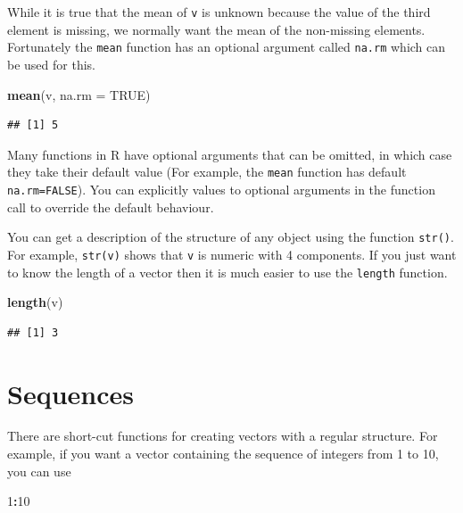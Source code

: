 \documentclass[
]{book}
\newenvironment{Shaded}{\begin{snugshade}}{\end{snugshade}}
\newcommand{\AttributeTok}[1]{\textcolor[rgb]{0.13,0.29,0.53}{#1}}
\newcommand{\ConstantTok}[1]{\textcolor[rgb]{0.56,0.35,0.01}{#1}}
\newcommand{\DecValTok}[1]{\textcolor[rgb]{0.00,0.00,0.81}{#1}}
\newcommand{\FunctionTok}[1]{\textcolor[rgb]{0.13,0.29,0.53}{\textbf{#1}}}
\newcommand{\NormalTok}[1]{#1}
\newcommand{\SpecialCharTok}[1]{\textcolor[rgb]{0.81,0.36,0.00}{\textbf{#1}}}
\theoremstyle{definition}
\theoremstyle{definition}
\theoremstyle{definition}
\theoremstyle{definition}
\theoremstyle{remark}
\begin{document}
While it is true that the mean of \texttt{v} is unknown because the value
of the third element is missing, we normally want the mean of the
non-missing elements. Fortunately the \texttt{mean} function has an
optional argument called \texttt{na.rm} which can be used for this.

\begin{Shaded}
\begin{Highlighting}[]
\FunctionTok{mean}\NormalTok{(v, }\AttributeTok{na.rm =} \ConstantTok{TRUE}\NormalTok{)}
\end{Highlighting}
\end{Shaded}

\begin{verbatim}
## [1] 5
\end{verbatim}

Many functions in R have optional arguments that can be omitted, in which
case they take their default value (For example, the \texttt{mean} function has
default \texttt{na.rm=FALSE}). You can explicitly values to optional arguments
in the function call to override the default behaviour.

You can get a description of the structure of any object using the
function \texttt{str()}. For example, \texttt{str(v)} shows that \texttt{v}
is numeric with 4 components. If you just want to know the length of a
vector then it is much easier to use the \texttt{length} function.

\begin{Shaded}
\begin{Highlighting}[]
\FunctionTok{length}\NormalTok{(v)}
\end{Highlighting}
\end{Shaded}

\begin{verbatim}
## [1] 3
\end{verbatim}

\section{Sequences}\label{sequences}

There are short-cut functions for creating vectors with a regular
structure. For example, if you want a vector containing the sequence of
integers from 1 to 10, you can use

\begin{Shaded}
\begin{Highlighting}[]
\DecValTok{1}\SpecialCharTok{:}\DecValTok{10}
\end{Highlighting}
\end{Shaded}
\end{document}
